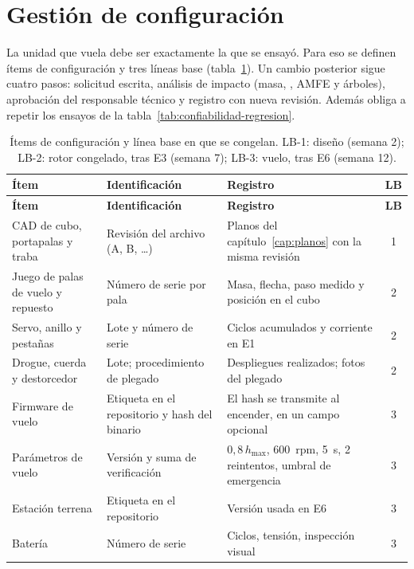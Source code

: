\section{Gestión de configuración}\label{sec:confiabilidad-config}
La unidad que vuela debe ser exactamente la que se ensayó. Para eso se definen ítems de
configuración y tres líneas base (tabla~\ref{tab:confiabilidad-items}). Un cambio
posterior sigue cuatro pasos: solicitud escrita, análisis de impacto (masa, ,
AMFE y árboles), aprobación del responsable técnico y registro con nueva revisión. Además
obliga a repetir los ensayos de la tabla~\ref{tab:confiabilidad-regresion}.

\begin{footnotesize}
\setlength{\tabcolsep}{5pt}
\begin{longtable}{@{}>{\raggedright\arraybackslash}p{3.9cm}>{\raggedright\arraybackslash}p{4.4cm}>{\raggedright\arraybackslash}p{6.2cm}c@{}}
\caption{Ítems de configuración y línea base en que se congelan. LB-1: diseño (semana 2);
LB-2: rotor congelado, tras E3 (semana 7); LB-3: vuelo, tras E6 (semana 12).}
\label{tab:confiabilidad-items}\\
\toprule
\textbf{Ítem} & \textbf{Identificación} & \textbf{Registro} & \textbf{LB}\\\midrule
\endfirsthead
\toprule
\textbf{Ítem} & \textbf{Identificación} & \textbf{Registro} & \textbf{LB}\\\midrule
\endhead
\bottomrule
\endfoot
CAD de cubo, portapalas y traba & Revisión del archivo (A, B, \ldots) & Planos del capítulo~\ref{cap:planos} con la misma revisión & 1\\
Juego de palas de vuelo y repuesto & Número de serie por pala & Masa, flecha, paso medido y posición en el cubo & 2\\
Servo, anillo y pestañas & Lote y número de serie & Ciclos acumulados y corriente en E1 & 2\\
Drogue, cuerda y destorcedor & Lote; procedimiento de plegado & Despliegues realizados; fotos del plegado & 2\\
Firmware de vuelo & Etiqueta en el repositorio y hash del binario & El hash se transmite al encender, en un campo opcional & 3\\
Parámetros de vuelo & Versión y suma de verificación & $0{,}8\,h_{\max}$, \SI{600}{rpm}, \SI{5}{s}, 2 reintentos, umbral de emergencia & 3\\
Estación terrena & Etiqueta en el repositorio & Versión usada en E6 & 3\\
Batería & Número de serie & Ciclos, tensión, inspección visual & 3\\
\end{longtable}
\end{footnotesize}

